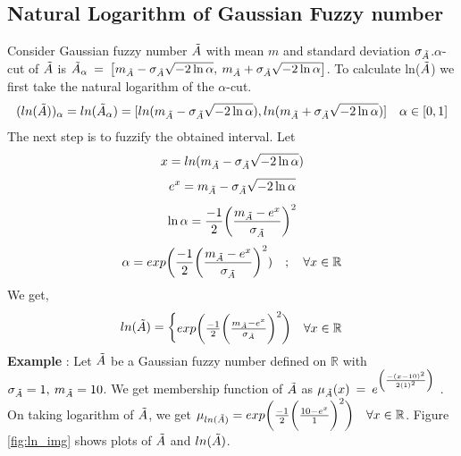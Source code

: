 \documentclass{article}
\begin{document}
\subsection{Natural Logarithm of Gaussian Fuzzy number}
Consider Gaussian fuzzy number $\Tilde{A}$ with mean $m$  and standard deviation $\sigma_{\Tilde{A}}$.\newline $\alpha$-cut of $\Tilde{A}$ is $\Tilde{A}_\alpha \: = \: \left[m_{\Tilde{A}}-\sigma_{\Tilde{A}}\sqrt{-2\ln{\alpha}}, \: m_{\Tilde{A}}+\sigma_{\Tilde{A}}\sqrt{-2\ln{\alpha}} \right]$.\newline 
To calculate ln($\Tilde{A}$)  we first take the natural logarithm of the $\alpha$-cut.
\[(ln(\Tilde{A}))_\alpha = ln(\Tilde{A}_\alpha)=[ln(m_{\Tilde{A}}-\sigma_{\Tilde{A}}\sqrt{-2\ln{\alpha}}),ln(m_{\Tilde{A}}+\sigma_{\Tilde{A}}\sqrt{-2\ln{\alpha}})]\quad\alpha\in [0,1]\]
The next step is to fuzzify the obtained interval. Let
\[x=ln(m_{\Tilde{A}}-\sigma_{\Tilde{A}}\sqrt{-2\ln{\alpha}})\]
\[e^{x}=m_{\Tilde{A}}-\sigma_{\Tilde{A}}\sqrt{-2\ln{\alpha}}\]
\[\ln{\alpha}=\frac{-1}{2}\biggl({\frac{m_{\Tilde{A}}- e^{x}}{\sigma_{\Tilde{A}}}}\biggr)^2\]
\[\alpha=exp\biggl(\frac{-1}{2}\biggl({\frac{m_{\Tilde{A}}-e^{x}}{\sigma_{\Tilde{A}}}}\biggr)^2)\quad ;\quad \forall x\in\mathbb{R}\]
We get,
\[ln({\Tilde{A}})=\begin{cases}
        exp\biggl(\frac{-1}{2}\biggl({\frac{m_{\Tilde{A}}- e^{x}}{\sigma_{\Tilde{A}}}}\biggr)^2\biggr)& \forall x \in \mathbb{R}\\
     
        \end{cases}\]
\textbf{Example} : Let $\Tilde{A}$ be a Gaussian fuzzy number defined on $\mathbb{R}$ with $\sigma_{\Tilde{A}} = 1, \:m_{\Tilde{A}} = 10$. We get membership function of $\Tilde{A}$  as $\mu_{\Tilde{A}}(x) \:=\:e^{\left( \frac{-(x-10)^2}{2(1)^{2}} \right)}$ . On taking logarithm of $\Tilde{A}$, we get $\mu_{ln({\Tilde{A}})}=exp\biggl(\frac{-1}{2}\biggl({\frac{10-e^{x}}{1}}\biggr)^2\biggr)\quad \forall x \in \mathbb{R} $. Figure \ref{fig:ln_img} shows plots of $\Tilde{A}$ and $ln(\Tilde{A})$.

\vspace{3cm}
\end{document}
